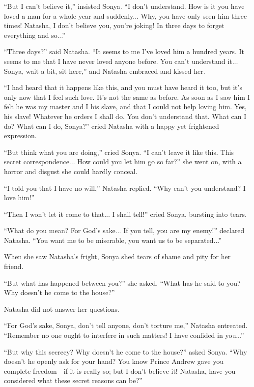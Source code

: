 ``But I can't believe it,'' insisted Sonya. ``I don't
understand. How is it you have loved a man for a whole year and
suddenly... Why, you have only seen him three times! Natasha, I
don't believe you, you're joking! In three days to forget
everything and so...''

``Three days?'' said Natasha. ``It seems to me I've loved him a
hundred years. It seems to me that I have never loved anyone
before. You can't understand it... Sonya, wait a bit, sit here,''
and Natasha embraced and kissed her.

``I had heard that it happens like this, and you must have heard
it too, but it's only now that I feel such love. It's not the
same as before. As soon as I saw him I felt he was my master and
I his slave, and that I could not help loving him. Yes, his
slave! Whatever he orders I shall do. You don't understand
that. What can I do? What can I do, Sonya?''  cried Natasha with
a happy yet frightened expression.

``But think what you are doing,'' cried Sonya. ``I can't leave it
like this. This secret correspondence... How could you let him go
so far?''  she went on, with a horror and disgust she could
hardly conceal.

``I told you that I have no will,'' Natasha replied. ``Why can't
you understand? I love him!''

``Then I won't let it come to that... I shall tell!'' cried
Sonya, bursting into tears.

``What do you mean? For God's sake... If you tell, you are my
enemy!''  declared Natasha. ``You want me to be miserable, you
want us to be separated...''

When she saw Natasha's fright, Sonya shed tears of shame and pity
for her friend.

``But what has happened between you?'' she asked. ``What has he
said to you? Why doesn't he come to the house?''

Natasha did not answer her questions.

``For God's sake, Sonya, don't tell anyone, don't torture me,''
Natasha entreated. ``Remember no one ought to interfere in such
matters! I have confided in you...''

``But why this secrecy? Why doesn't he come to the house?'' asked
Sonya.  ``Why doesn't he openly ask for your hand? You know
Prince Andrew gave you complete freedom---if it is really so; but
I don't believe it!  Natasha, have you considered what these
secret reasons can be?''

